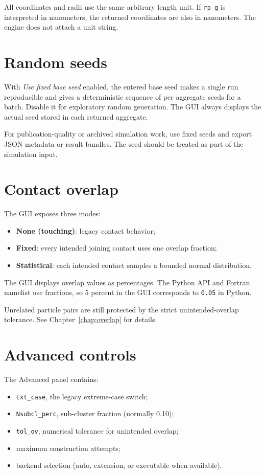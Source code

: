 \documentclass[11pt,oneside]{report}
\newcommand{\code}[1]{\texttt{#1}}
\begin{document}
All coordinates and radii use the same arbitrary length unit. If \code{rp\_g}
is interpreted in nanometers, the returned coordinates are also in nanometers.
The engine does not attach a unit string.

\section{Random seeds}

With \emph{Use fixed base seed} enabled, the entered base seed makes a single
run reproducible and gives a deterministic sequence of per-aggregate seeds for
a batch. Disable it for exploratory random generation. The GUI always displays
the actual seed stored in each returned aggregate.

\begin{tipbox}
For publication-quality or archived simulation work, use fixed seeds and export
JSON metadata or result bundles. The seed should be treated as part of the
simulation input.
\end{tipbox}

\section{Contact overlap}

The GUI exposes three modes:
\begin{itemize}
  \item \textbf{None (touching)}: legacy contact behavior;
  \item \textbf{Fixed}: every intended joining contact uses one overlap fraction;
  \item \textbf{Statistical}: each intended contact samples a bounded normal distribution.
\end{itemize}

The GUI displays overlap values as percentages. The Python API and Fortran
namelist use fractions, so 5 percent in the GUI corresponds to \code{0.05} in
Python.

Unrelated particle pairs are still protected by the strict unintended-overlap
tolerance. See Chapter~\ref{chap:overlap} for details.

\section{Advanced controls}

The Advanced panel contains:
\begin{itemize}
  \item \code{Ext\_case}, the legacy extreme-case switch;
  \item \code{Nsubcl\_perc}, sub-cluster fraction (normally 0.10);
  \item \code{tol\_ov}, numerical tolerance for unintended overlap;
  \item maximum construction attempts;
  \item backend selection (auto, extension, or executable when available).
\end{itemize}
\end{document}
